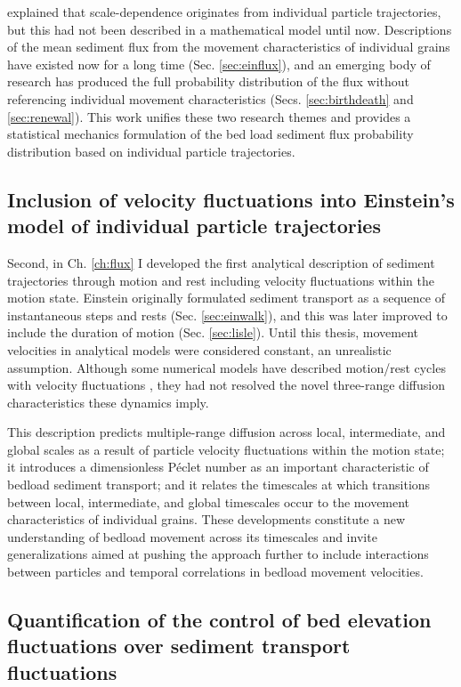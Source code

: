 \citet{Ballio2018} explained that scale-dependence originates from individual particle trajectories, but this had not been described in a mathematical model until now.
Descriptions of the mean sediment flux from the movement characteristics of individual grains have existed now for a long time (Sec. \ref{sec:einflux}), and an emerging body of research has produced the full probability distribution of the flux without referencing individual movement characteristics (Secs. \ref{sec:birthdeath} and \ref{sec:renewal}). 
This work unifies these two research themes and provides a statistical mechanics formulation of the bed load sediment flux probability distribution based on individual particle trajectories.

\subsection{Inclusion of velocity fluctuations into Einstein's model of individual particle trajectories}

Second, in Ch. \ref{ch:flux} I developed the first analytical description of sediment trajectories through motion and rest including velocity fluctuations within the motion state.
Einstein originally formulated sediment transport as a sequence of instantaneous steps and rests (Sec. \ref{sec:einwalk}), and this was later improved to include the duration of motion (Sec. \ref{sec:lisle}).
Until this thesis, movement velocities in analytical models were considered constant, an unrealistic assumption.
Although some numerical models have described motion/rest cycles with velocity fluctuations \citep{Fan2016,Bialik2012,Schmeeckle2014}, they had not resolved the novel three-range diffusion characteristics these dynamics imply.

This description predicts multiple-range diffusion across local, intermediate, and global scales as a result of particle velocity fluctuations within the motion state; it introduces a dimensionless P\'{e}clet number as an important characteristic of bedload sediment transport; and it relates the timescales at which transitions between local, intermediate, and global timescales occur to the movement characteristics of individual grains.
These developments constitute a new understanding of bedload movement across its timescales and invite generalizations aimed at pushing the approach further to include interactions between particles and temporal correlations in bedload movement velocities.

\subsection{Quantification of the control of bed elevation fluctuations over sediment transport fluctuations}

